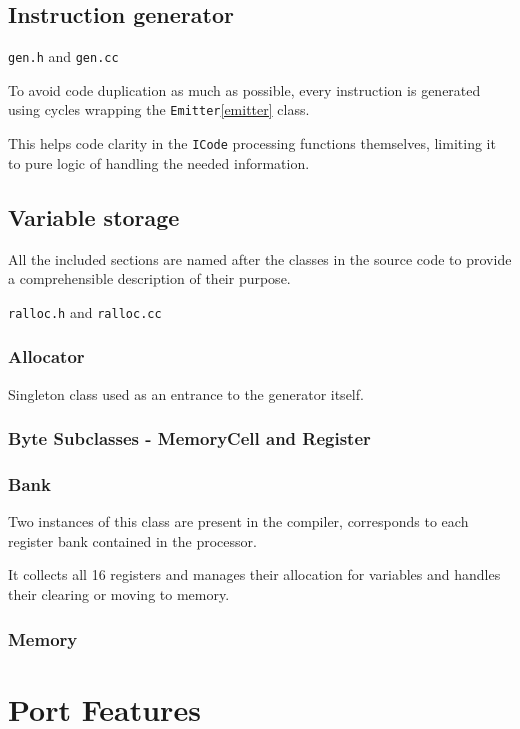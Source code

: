 \section{Instruction generator}

\texttt{gen.h} and \texttt{gen.cc}

To avoid code duplication as much as possible, every instruction is generated using cycles wrapping the \texttt{Emitter}\ref{emitter} class.

This helps code clarity in the \texttt{ICode} processing functions themselves, limiting it to pure logic of handling the needed information.

\section{Variable storage}

All the included sections are named after the classes in the source code to provide a comprehensible description of their purpose.

\texttt{ralloc.h} and \texttt{ralloc.cc}

    \subsection{Allocator}

    Singleton class used as an entrance to the generator itself.

    \subsection{Byte Subclasses - MemoryCell and Register}

    \subsection{Bank}

    Two instances of this class are present in the compiler, corresponds to each register bank contained in the processor.

    It collects all 16 registers and manages their allocation for variables and handles their clearing or moving to memory.

    \subsection{Memory}


\chapter{Port Features}\label{features}


